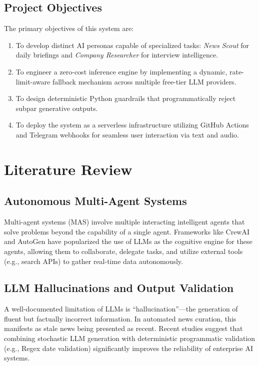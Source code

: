 \documentclass[conference]{IEEEtran}
\begin{document}
\subsection{Project Objectives}
The primary objectives of this system are:
\begin{enumerate}
    \item To develop distinct AI personas capable of specialized tasks: \textit{News Scout} for daily briefings and \textit{Company Researcher} for interview intelligence.
    \item To engineer a zero-cost inference engine by implementing a dynamic, rate-limit-aware fallback mechanism across multiple free-tier LLM providers.
    \item To design deterministic Python guardrails that programmatically reject subpar generative outputs.
    \item To deploy the system as a serverless infrastructure utilizing GitHub Actions and Telegram webhooks for seamless user interaction via text and audio.
\end{enumerate}

\section{Literature Review}

\subsection{Autonomous Multi-Agent Systems}
Multi-agent systems (MAS) involve multiple interacting intelligent agents that solve problems beyond the capability of a single agent. Frameworks like CrewAI and AutoGen have popularized the use of LLMs as the cognitive engine for these agents, allowing them to collaborate, delegate tasks, and utilize external tools (e.g., search APIs) to gather real-time data autonomously.

\subsection{LLM Hallucinations and Output Validation}
A well-documented limitation of LLMs is ``hallucination''---the generation of fluent but factually incorrect information. In automated news curation, this manifests as stale news being presented as recent. Recent studies suggest that combining stochastic LLM generation with deterministic programmatic validation (e.g., Regex date validation) significantly improves the reliability of enterprise AI systems.
\end{document}
